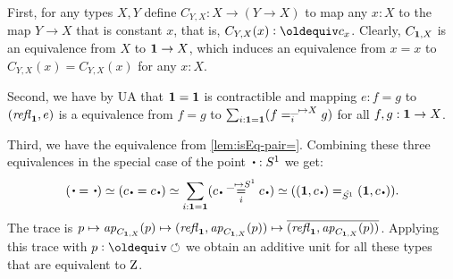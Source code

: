 First, for any types $X,Y$ 
define $C_{Y,X} : X\to (Y\to X)$ to map any $x:X$ to the map $Y\to X$
that is constant $x$, that is, $C_{Y,X}(x)\defeq c_x$.
Clearly, $C_{\mathbf{1},X}$ is an equivalence from $X$ to $\mathbf{1}\to X$,
which induces an equivalence from $x=x$ to $C_{Y,X}(x) = C_{Y,X}(x)$
for any $x:X$.

Second, we have by UA that $\mathbf{1}=\mathbf{1}$ is contractible
and mapping $e: f=g$ to $(\mathop{{\it refl}_{\mathbf{1}}},e)$ is a equivalence from 
$f=g$ to $\sum_{i:\mathbf{1}=\mathbf{1}} (f =^{\_\mapsto X}_{i} g)$ 
for all $f,g:\mathbf{1}\to X$.

Third, we have the equivalence from \cref{lem:isEq-pair=}. 
Combining these three equivalences in the special case of the point $\base:\Sc$ we get:
\[
(\base=\base) \equiv (c_\base=c_\base) \equiv
\sum_{i:\bn{1}=\bn{1}} (\pathoverdisplay{c_\base}{\_\mapsto \Sc}{i}{c_\base}) \equiv 
((\bn{1},c_\base)=_{\hat\Sc}(\bn{1},c_\base)).
\]
The trace is $p \mapsto \mathop{{\it ap}_{C_{\mathbf{1},X}}}(p) \mapsto 
(\mathop{{\it refl}_{\mathbf{1}}},\mathop{{\it ap}_{C_{\mathbf{1},X}}}(p)) \mapsto \overline{({\mathop{{\it refl}_{\mathbf{1}}}},{\mathop{{\it ap}_{C_{\mathbf{1},X}}}(p)})}$.
Applying this trace with $p\defeq\Sloop$ we obtain an additive unit for
all these types that are equivalent to $\mathrm{Z}$.

 


